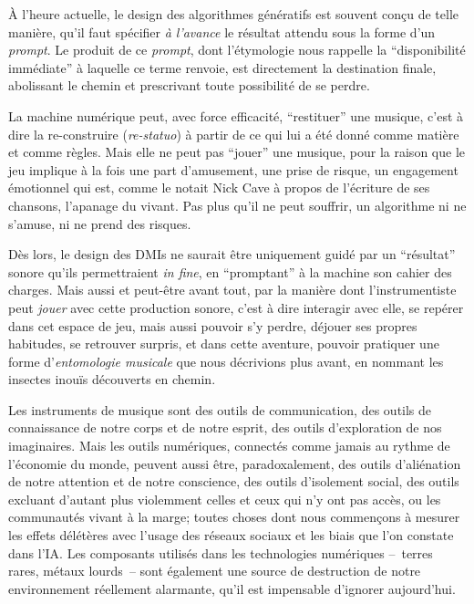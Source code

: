 À l'heure actuelle, le design des algorithmes génératifs est souvent conçu de telle manière, qu'il faut spécifier \textit{à l'avance} le résultat attendu sous la forme d'un \textit{prompt}. Le produit de ce \textit{prompt}, dont l'étymologie nous rappelle la ``disponibilité immédiate'' à laquelle ce terme renvoie, est directement la destination finale, abolissant le chemin et prescrivant toute possibilité de se perdre. 

La machine numérique peut, avec force efficacité, ``restituer'' une musique, c'est à dire la re-construire (\textit{re-statuo}) à partir de ce qui lui a été donné comme matière et comme règles. Mais elle ne peut pas ``jouer'' une musique, pour la raison que le jeu implique à la fois une part d'amusement, une prise de risque, un engagement émotionnel qui est, comme le notait Nick Cave à propos de l'écriture de ses chansons, l'apanage du vivant. Pas plus qu'il ne peut souffrir, un algorithme ni ne s'amuse, ni ne prend des risques.

Dès lors, le design des \glspl{DMI} ne saurait être uniquement guidé par un ``résultat'' sonore qu'ils permettraient \textit{in fine}, en ``promptant'' à la machine son cahier des charges. Mais aussi et peut-être avant tout, par la manière dont l'instrumentiste peut \textit{jouer} avec cette production sonore, c'est à dire interagir avec elle, se repérer dans cet espace de jeu, mais aussi pouvoir s'y perdre, déjouer ses propres habitudes, se retrouver surpris, et dans cette aventure, pouvoir pratiquer une forme d'\textit{entomologie musicale} que nous décrivions plus avant, en nommant les insectes inouïs découverts en chemin.

Les instruments de musique sont des outils de communication, des outils de connaissance de notre corps et de notre esprit, des outils d'exploration de nos imaginaires. Mais les outils numériques, connectés comme jamais au rythme de l'économie du monde, peuvent aussi être, paradoxalement, des outils d'aliénation de notre attention et de notre conscience, des outils d'isolement social, des outils excluant d'autant plus violemment celles et ceux qui n'y ont pas accès, ou les communautés vivant à la marge; toutes choses dont nous commençons à mesurer les effets délétères avec l'usage des réseaux sociaux et les biais que l'on constate dans l'IA. Les composants utilisés dans les technologies numériques --~terres rares, métaux lourds~-- sont également une source de destruction de notre environnement réellement alarmante, qu'il est impensable d'ignorer aujourd'hui.

